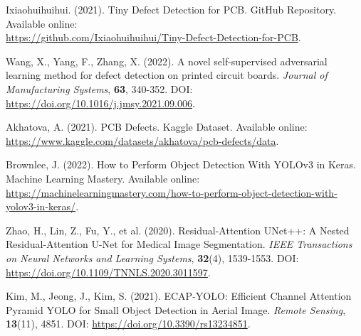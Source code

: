 \documentclass[12pt]{article}
\begin{document}
\begin{thebibliography}{10} 
    Ixiaohuihuihui. (2021). Tiny Defect Detection for PCB. GitHub Repository. Available online: \\\url{https://github.com/Ixiaohuihuihui/Tiny-Defect-Detection-for-PCB}.
    
    Wang, X., Yang, F., Zhang, X. (2022). A novel self-supervised adversarial learning method for defect detection on printed circuit boards. \textit{Journal of Manufacturing Systems}, \textbf{63}, 340-352. DOI: \url{https://doi.org/10.1016/j.jmsy.2021.09.006}.
    
    Akhatova, A. (2021). PCB Defects. Kaggle Dataset. Available online: \url{https://www.kaggle.com/datasets/akhatova/pcb-defects/data}.
    
    Brownlee, J. (2022). How to Perform Object Detection With YOLOv3 in Keras. Machine Learning Mastery. Available online: \url{https://machinelearningmastery.com/how-to-perform-object-detection-with-yolov3-in-keras/}.
    
    Zhao, H., Lin, Z., Fu, Y., et al. (2020). Residual-Attention UNet++: A Nested Residual-Attention U-Net for Medical Image Segmentation. \textit{IEEE Transactions on Neural Networks and Learning Systems}, \textbf{32}(4), 1539-1553. DOI: \url{https://doi.org/10.1109/TNNLS.2020.3011597}.

    Kim, M., Jeong, J., Kim, S. (2021). ECAP-YOLO: Efficient Channel Attention Pyramid YOLO for Small Object Detection in Aerial Image. \textit{Remote Sensing}, \textbf{13}(11), 4851. DOI: \url{https://doi.org/10.3390/rs13234851}.
    
\end{thebibliography}

\clearpage
\newpage
\end{document}
